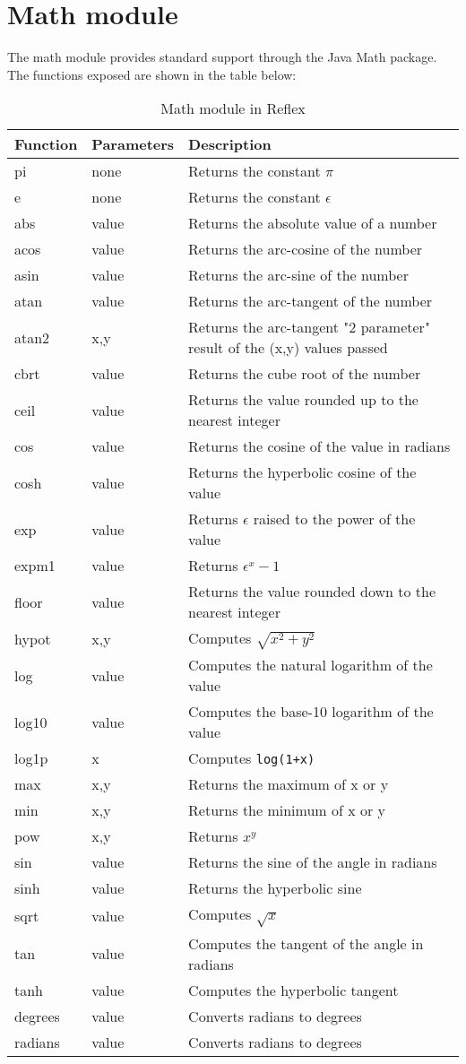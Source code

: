 \section{Math module}
The math module provides standard support through the Java Math package. The functions exposed are shown in the table below:
\begin{table}[!h]
  \small
\centering
\begin{tabular} { | l | l | p{9cm}  | }
\hline
Function  & Parameters & Description   \\
\hline
pi & none & Returns the constant $\pi$   \\
e & none & Returns the constant $\epsilon$   \\
abs & value & Returns the absolute value of a number  \\
acos & value & Returns the arc-cosine of the number \\
asin & value & Returns the arc-sine of the number \\
atan & value & Returns the arc-tangent of the number \\
atan2 & x,y & Returns the arc-tangent "2 parameter" result of the (x,y) values passed \\
cbrt & value & Returns the cube root of the number \\
ceil & value & Returns the value rounded up to the nearest integer \\
cos & value & Returns the cosine of the value in radians \\
cosh & value & Returns the hyperbolic cosine of the value \\
exp & value & Returns $\epsilon$ raised to the power of the value \\
expm1 & value & Returns $\epsilon^x - 1 $ \\
floor & value & Returns the value rounded down to the nearest integer \\
hypot & x,y & Computes $ \sqrt { x^2 + y^2 } $ \\
log & value & Computes the natural logarithm of the value \\
log10 & value & Computes the base-10 logarithm of the value \\
log1p & x & Computes \Verb^log(1+x)^ \\
max & x,y & Returns the maximum of x or y \\
min & x,y & Returns the minimum of x or y \\
pow & x,y & Returns $x^y$ \\
sin & value & Returns the sine of the angle in radians \\
sinh & value & Returns the hyperbolic sine \\
sqrt & value & Computes $\sqrt x $ \\
tan & value & Computes the tangent of the angle in radians \\
tanh & value & Computes the hyperbolic tangent \\
degrees & value & Converts radians to degrees \\
radians & value & Converts radians to degrees \\
\hline
\end{tabular}
\caption{Math module in Reflex}
\end{table}

